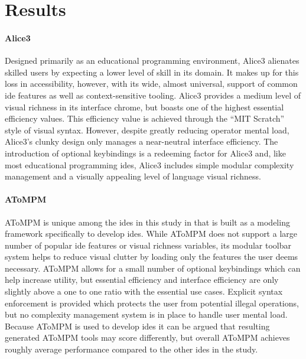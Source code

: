 \section{Results}
\label{sec:results}


\paragraph{Alice3} Designed primarily as an educational programming
environment, Alice3 alienates skilled users by expecting a lower level of
skill in its domain. It makes up for this loss in accessibility, however,
with its wide, almost universal, support of common \ac{ide} features as
well as context-sensitive tooling. Alice3 provides a medium level of visual
richness in its interface chrome, but boasts one of the highest essential
efficiency values. This efficiency value is achieved through the ``MIT
Scratch'' style of visual syntax. However, despite greatly reducing
operator mental load, Alice3's clunky design only manages a near-neutral
interface efficiency. The introduction of optional keybindings is a
redeeming factor for Alice3 and, like most educational programming
\acp{ide}, Alice3 includes simple modular complexity management and a
visually appealing level of language visual richness.

\paragraph{AToMPM} AToMPM is unique among the \acp{ide} in this study in
that is built as a modeling framework specifically to develop \acp{ide}.
While AToMPM does not support a large number of popular \ac{ide} features
or visual richness variables, its modular toolbar system helps to reduce
visual clutter by loading only the features the user deems necessary.
AToMPM allows for a small number of optional keybindings which can help
increase utility, but essential efficiency and interface efficiency are
only slightly above a one to one ratio with the essential use cases.
Explicit syntax enforcement is provided which protects the user from
potential illegal operations, but no complexity management system is in
place to handle user mental load. Because AToMPM is used to develop
\acp{ide} it can be argued that resulting generated AToMPM tools may score
differently, but overall AToMPM achieves roughly average performance
compared to the other \acp{ide} in the study.

